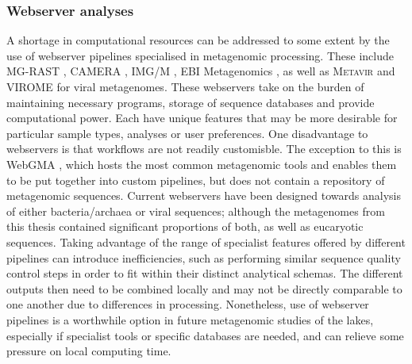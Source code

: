 \subsubsection{Webserver analyses}
A shortage in computational resources can be addressed to some extent by the use of webserver pipelines specialised in metagenomic processing.
These include \acs{MG-RAST} \cite{Meyer2008}, \acs{CAMERA} \cite{Sun2011}, \acs{IMG/M} \cite{Markowitz2008, Markowitz2012}, EBI Metagenomics \cite{Hunter2012}, as well as \textsc{Metavir} \cite{Roux2011} and \acs{VIROME} \cite{Wommack2012} for viral metagenomes.
These webservers take on the burden of maintaining necessary programs, storage of sequence databases and provide computational power.
Each have unique features that may be more desirable for particular sample types, analyses or user preferences.
One disadvantage to webservers is that workflows are not readily customisble.
The exception to this is WebGMA \cite{Wu2011a}, which hosts the most common metagenomic tools and enables them to be put together into custom pipelines, but does not contain a repository of metagenomic sequences.
Current webservers have been designed towards analysis of either bacteria/archaea or viral sequences; although the metagenomes from this thesis contained significant proportions of both, as well as eucaryotic sequences.
Taking advantage of the range of specialist features offered by different pipelines can introduce inefficiencies, such as performing similar sequence quality control steps in order to fit within their distinct analytical schemas. 
The different outputs then need to be combined locally and may not be directly comparable to one another due to differences in processing.
Nonetheless, use of webserver pipelines is a worthwhile option in future metagenomic studies of the lakes, especially if specialist tools or specific databases are needed, and can relieve some pressure on local computing time.

